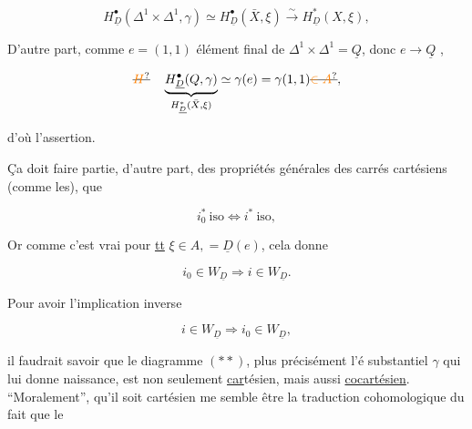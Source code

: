 \[
H^\bullet_{\underline D}(\Delta^1\times\Delta^1,\gamma)\simeq H^\bullet_{\underline D}(\bar X,\xi)\xrightarrow{\sim}H^*_{\underline D}(X,\xi),
\]


D'autre part, comme $e=(1,1)$ élément final de $\Delta^1\times\Delta^1=\underline Q$, donc $e\to\underline Q$ ,

\[
\deleted{\unsure{H}}\quad\underbrace{H^\bullet_{\underline D}(Q,\gamma)}_{H^*_{\underline D}(\bar X,\xi)}\simeq\gamma(e)=\gamma(1,1)\deleted{\unsure{\in A}},
\]

d'où l'assertion.

Ça doit faire partie, d'autre part, des propriétés générales des carrés cartésiens   (comme les), que


\[
i_0^*\ \text{iso}\Longleftrightarrow i^*\ \text{iso},
\]

Or comme c'est vrai pour \uline{tt} $\xi\in A,=\underline D(e)$, cela donne

\[
i_0\in W_{\underline D}\Longrightarrow{i}\in W_{\underline D}.
\]



Pour avoir l'implication inverse

\[
i\in W_{\underline D}\Longrightarrow i_0\in W_{\underline D},
\]

il faudrait savoir que le diagramme $(**)$, plus  précisément l'é  substantiel $\gamma$ qui lui donne naissance, est non seulement \uline{car}tésien, mais aussi \uline{cocartésien}. ``Moralement'', qu'il soit cartésien me semble être la traduction cohomologique du fait que le 


